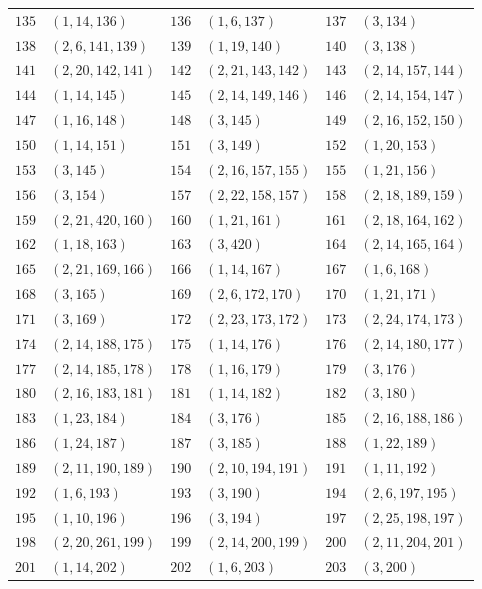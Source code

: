 {\begin{longtable}{@{}rl@{\qquad}rl@{\qquad}rl@{}}
\(135\)&\((1,14,136)\) & \(136\)&\((1,6,137)\) & \(137\)&\((3,134)\)\\
\(138\)&\((2,6,141,139)\) & \(139\)&\((1,19,140)\) & \(140\)&\((3,138)\)\\
\(141\)&\((2,20,142,141)\) & \(142\)&\((2,21,143,142)\) & \(143\)&\((2,14,157,144)\)\\
\(144\)&\((1,14,145)\) & \(145\)&\((2,14,149,146)\) & \(146\)&\((2,14,154,147)\)\\
\(147\)&\((1,16,148)\) & \(148\)&\((3,145)\) & \(149\)&\((2,16,152,150)\)\\
\(150\)&\((1,14,151)\) & \(151\)&\((3,149)\) & \(152\)&\((1,20,153)\)\\
\(153\)&\((3,145)\) & \(154\)&\((2,16,157,155)\) & \(155\)&\((1,21,156)\)\\
\(156\)&\((3,154)\) & \(157\)&\((2,22,158,157)\) & \(158\)&\((2,18,189,159)\)\\
\(159\)&\((2,21,420,160)\) & \(160\)&\((1,21,161)\) & \(161\)&\((2,18,164,162)\)\\
\(162\)&\((1,18,163)\) & \(163\)&\((3,420)\) & \(164\)&\((2,14,165,164)\)\\
\(165\)&\((2,21,169,166)\) & \(166\)&\((1,14,167)\) & \(167\)&\((1,6,168)\)\\
\(168\)&\((3,165)\) & \(169\)&\((2,6,172,170)\) & \(170\)&\((1,21,171)\)\\
\(171\)&\((3,169)\) & \(172\)&\((2,23,173,172)\) & \(173\)&\((2,24,174,173)\)\\
\(174\)&\((2,14,188,175)\) & \(175\)&\((1,14,176)\) & \(176\)&\((2,14,180,177)\)\\
\(177\)&\((2,14,185,178)\) & \(178\)&\((1,16,179)\) & \(179\)&\((3,176)\)\\
\(180\)&\((2,16,183,181)\) & \(181\)&\((1,14,182)\) & \(182\)&\((3,180)\)\\
\(183\)&\((1,23,184)\) & \(184\)&\((3,176)\) & \(185\)&\((2,16,188,186)\)\\
\(186\)&\((1,24,187)\) & \(187\)&\((3,185)\) & \(188\)&\((1,22,189)\)\\
\(189\)&\((2,11,190,189)\) & \(190\)&\((2,10,194,191)\) & \(191\)&\((1,11,192)\)\\
\(192\)&\((1,6,193)\) & \(193\)&\((3,190)\) & \(194\)&\((2,6,197,195)\)\\
\(195\)&\((1,10,196)\) & \(196\)&\((3,194)\) & \(197\)&\((2,25,198,197)\)\\
\(198\)&\((2,20,261,199)\) & \(199\)&\((2,14,200,199)\) & \(200\)&\((2,11,204,201)\)\\
\(201\)&\((1,14,202)\) & \(202\)&\((1,6,203)\) & \(203\)&\((3,200)\)\\

\end{longtable}}
